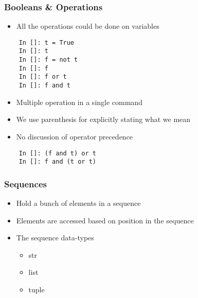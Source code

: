 \begin{frame}[fragile]
  \frametitle{Booleans \& Operations}
  \begin{itemize}
  \item All the operations could be done on variables
  \end{itemize}
  \begin{lstlisting}
    In []: t = True
    In []: t
    In []: f = not t
    In []: f
    In []: f or t
    In []: f and t
  \end{lstlisting}
  \begin{itemize}
  \item Multiple operation in a single command
  \item We use parenthesis for explicitly stating what we mean
  \item No discussion of operator precedence
  \end{itemize}
  \begin{lstlisting}
    In []: (f and t) or t
    In []: f and (t or t)
  \end{lstlisting}
\end{frame}

\begin{frame}[fragile]
  \frametitle{Sequences}
  \begin{itemize}
  \item Hold a bunch of elements in a sequence
  \item Elements are accessed based on position in the sequence
  \item The sequence data-types
    \begin{itemize}
    \item str
    \item list
    \item tuple
    \end{itemize}
  \end{itemize}
\end{frame}

